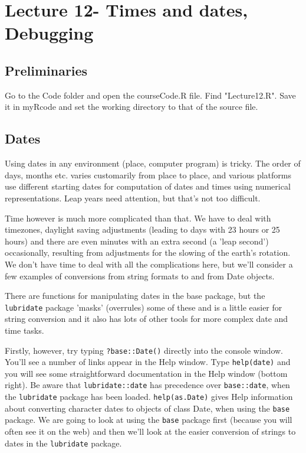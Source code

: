 \documentclass[titlepage]{book}\usepackage{knitr}
\begin{document}
\chapter{Lecture 12- Times and dates, Debugging}
\label{Lecture12}


\author{Brian Williams $<$\href{mailto:bjw649@gmail.com}%
{bjw649@gmail.com}$>$}


\section{Preliminaries}

Go to the Code folder and open the courseCode.R file.  Find "Lecture12.R". Save it in myRcode and set the working directory to that of the source file.


\section{Dates}

Using dates in any environment (place, computer program) is tricky.  The order of days, months etc. varies customarily from place to place, and various platforms use different starting dates for computation of dates and times using numerical representations. Leap years need attention, but that's not too difficult.  

Time however is much more complicated than that. We have to deal with timezones, daylight saving adjustments (leading to days with 23 hours or 25 hours) and there are even minutes with an extra second (a 'leap second') occasionally, resulting from adjustments for the slowing of the earth's rotation. We don't have time to deal with all the complications here, but we'll consider a few examples of conversions from string formats to and from Date objects.

There are functions for manipulating dates in the base package, but the \texttt{lubridate} package 'masks' (overrules) some of these and is a little easier for string conversion and it also has lots of other tools for more complex date and time tasks.

Firstly, however, try typing \texttt{?base::Date()} directly into the console window.
You'll see a number of links appear in the Help window. 
Type \texttt{help(date)} and you will see some straightforward documentation in the Help window (bottom right). Be aware that \texttt{lubridate::date} has precedence over \texttt{base::date}, when the \texttt{lubridate} package has been loaded. 
\texttt{help(as.Date)} gives Help information about converting character dates to objects of class Date, when using the \texttt{base} package.  We are going to look at using the \texttt{base} package first (because you will often see it on the web) and then we'll look at the easier conversion of strings to dates in the \texttt{lubridate} package. 
\end{document}
